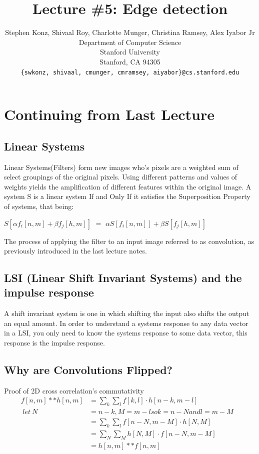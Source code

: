 \documentclass{article}
\title{Lecture \#5: Edge detection}
\author{
  Stephen Konz, Shivaal Roy, Charlotte Munger, Christina Ramsey, Alex Iyabor Jr \\
  Department of Computer Science\\
  Stanford University\\
  Stanford, CA 94305 \\
  \texttt{\{swkonz, shivaal, cmunger, cmramsey, aiyabor\}@cs.stanford.edu} \\
}
\begin{document}
\maketitle


\section{Continuing from Last Lecture}
\subsection{Linear Systems}
Linear Systems(Filters) form new images who's pixels are a weighted sum of select groupings of the original pixels. Using different patterns and values of weights yields the amplification of different features within the original image. A system S is a linear system If and Only If it satisfies the Superposition Property of systems, that being:
\begin{center}
$S[\alpha f_i[n,m] + \beta f_j[h,m]]$ $=$ $\alpha S[f_i[n,m]] + \beta S[f_j[h,m]]$
\end{center}

The process of applying the filter to an input image referred to as convolution, as previously introduced in the last lecture notes.

\subsection{LSI (Linear Shift Invariant Systems) and the impulse response}
A shift invariant system is one in which shifting the input also shifts the output an equal amount. In order to understand a systems response to any data vector in a LSI, you only need to know the systems response to some data vector, this response is the impulse response. 

\subsection{Why are Convolutions Flipped?}
Proof of 2D cross correlation's commutativity
\begin{align}
f[n,m] * * h[n,m] &= \sum_{k}^{} \sum_{l}^{} f[k,l] \cdot h[n-k,m-l]&\\
\ let \ N &= n - k, M = m-l so k = n - N and l = m - M &\\
&= \sum_{k}^{} \sum_{l}^{} f[n-N, m-M] \cdot h[N,M]&\\
&= \sum_{N}^{} \sum_{M}^{} h[N,M] \cdot f[n-N, m-M] &\\
&= h[n,m] * * f[n,m]&\\
\end{align}
\end{document}
